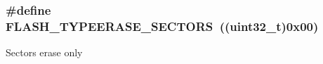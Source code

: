 \subsubsection[{\texorpdfstring{F\+L\+A\+S\+H\+\_\+\+T\+Y\+P\+E\+E\+R\+A\+S\+E\+\_\+\+S\+E\+C\+T\+O\+RS}{FLASH_TYPEERASE_SECTORS}}]{\setlength{\rightskip}{0pt plus 5cm}\#define F\+L\+A\+S\+H\+\_\+\+T\+Y\+P\+E\+E\+R\+A\+S\+E\+\_\+\+S\+E\+C\+T\+O\+RS~((uint32\+\_\+t)0x00)}\hypertarget{group___f_l_a_s_h_ex___type___erase_gaee700cbbc746cf72fca3ebf07ee20c4e}{}\label{group___f_l_a_s_h_ex___type___erase_gaee700cbbc746cf72fca3ebf07ee20c4e}
Sectors erase only 